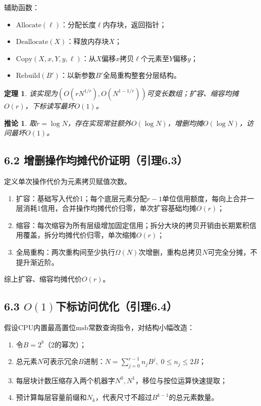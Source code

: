 \documentclass[11pt,a4paper]{article}
\newtheorem{thm}{定理}[section]
\newtheorem{cor}{推论}[section]
\begin{document}
辅助函数：
\begin{itemize}
    \item $\text{Allocate}(\ell)$：分配长度$\ell$内存块，返回指针；
    \item $\text{Deallocate}(X)$：释放内存块$X$；
    \item $\text{Copy}(X,x,Y,y,\ell)$：从$X$偏移$x$拷贝$\ell$个元素至$Y$偏移$y$；
    \item $\text{Rebuild}(B')$：以新参数$B'$全局重构整套分层结构。
\end{itemize}

\begin{thm}
该实现为$(O(rN^{1/r}),O(N^{1-1/r}))$可变长数组；扩容、缩容均摊$O(r)$，下标读写最坏$O(1)$。
\end{thm}

\begin{cor}
取$r=\log N$，存在实现常驻额外$O(\log N)$，增删均摊$O(\log N)$，访问最坏$O(1)$。
\end{cor}

\subsection{6.2 增删操作均摊代价证明（引理6.3）}
定义单次操作代价为元素拷贝赋值次数。
\begin{enumerate}
    \item 扩容：基础写入代价1；每个底层元素分配$r-1$单位信用额度，每向上合并一层消耗1信用，合并操作均摊代价归零，单次扩容基础均摊$O(r)$；
    \item 缩容：每次缩容为所有层级增加固定信用；拆分大块的拷贝开销由长期累积信用覆盖，拆分均摊代价归零，单次缩摊$O(r)$；
    \item 全局重构：两次重构间至少执行$\Omega(N)$次增删，重构总拷贝$N$可完全分摊，不提升渐近阶。
\end{enumerate}
综上扩容、缩容均摊代价$O(r)$。

\subsection{6.3 \texorpdfstring{$O(1)$}{O(1)}下标访问优化（引理6.4）}
假设CPU内置最高置位$\text{msb}$常数查询指令，对结构小幅改造：
\begin{enumerate}
    \item 令$B=2^b$（2的幂次）；
    \item 总元素$N$可表示冗余$B$进制：$N=\sum_{j=0}^{r-1}n_j B^j,\;0\le n_j\le2B$；
    \item 每层块计数压缩存入两个机器字$N^0,N^1$，移位与按位运算快速提取；
    \item 预计算每层容量前缀和$N_k$，代表尺寸不超过$B^{k-1}$的总元素数量。
\end{enumerate}
\end{document}

